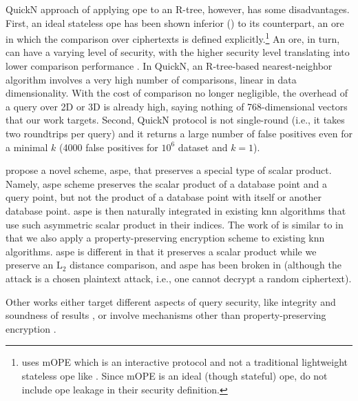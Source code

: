 		QuickN approach of applying \acrshort{ope} to an R-tree, however, has some disadvantages.
		First, an ideal stateless \acrshort{ope} has been shown inferior (\cite{ope-leakage}) to its counterpart, an \acrfull{ore} in which the comparison over ciphertexts is defined explicitly.\footnote{
			\cite{quick-n} uses mOPE \cite{ope-ideal-security-protocol} which is an interactive protocol and not a traditional lightweight stateless \acrshort{ope} like \cite{bclo-ope}.
			Since mOPE is an ideal (though stateful) \acrshort{ope}, \textcite{quick-n} do not include \acrshort{ope} leakage in their security definition.
		}
		An \acrshort{ore}, in turn, can have a varying level of security, with the higher security level translating into lower comparison performance \cite{ore-benchmark-17}.
		In QuickN, an R-tree-based nearest-neighbor algorithm involves a very high number of comparisons, linear in data dimensionality.
		With the cost of comparison no longer negligible, the overhead of a query over 2D or 3D is already high, saying nothing of 768-dimensional vectors that our work targets.
		Second, QuickN protocol is not single-round (i.e., it takes two roundtrips per query) and it returns a large number of false positives even for a minimal $k$ (\num{4000} false positives for $10^6$ dataset and $k = 1$).

		\textcite{knn-aspe} propose a novel scheme, \acrshort{aspe}, that preserves a special type of scalar product.
		Namely, \acrfull{aspe} scheme preserves the scalar product of a database point and a query point, but not the product of a database point with itself or another database point.
		\acrshort{aspe} is then naturally integrated in existing \acrshort{knn} algorithms that use such asymmetric scalar product in their indices.
		The work of \textcite{knn-aspe} is similar to \kanon{} in that we also apply a property-preserving encryption scheme to existing \acrshort{knn} algorithms.
		\acrshort{aspe} is different in that it preserves a scalar product while we preserve an $\text{L}_2$ distance comparison, and \acrshort{aspe} has been broken in \cite{secure-nn-revisited-break-aspe} (although the attack is a chosen plaintext attack, i.e., one cannot decrypt a random ciphertext).

		Other works either target different aspects of query security, like integrity and soundness of results \cite{knn-integrity-soundness,svknn}, or involve mechanisms other than property-preserving encryption \cite{seceqp,practical-approx-knn,knn-sharing-keys,knn-mult-data-owners,knn-over-encrypted,knn-paillier,knn-blind,knn-homomorphism,knn-strong-location-privacy,knn-no-anonymizers,knn-efficient,knn-new-casper}.
